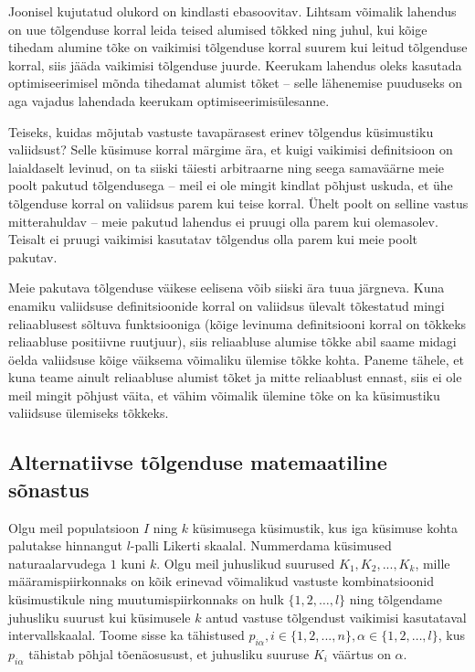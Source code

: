 \documentclass[a4paper,12pt,oneside]{article}
\numberwithin{equation}{section}
\theoremstyle{definition}
\begin{document}
Joonisel kujutatud olukord on kindlasti ebasoovitav. Lihtsam võimalik lahendus on uue tõlgenduse korral leida teised alumised tõkked ning juhul, kui kõige tihedam alumine tõke on vaikimisi tõlgenduse korral suurem kui leitud tõlgenduse korral, siis jääda vaikimisi tõlgenduse juurde. Keerukam lahendus oleks kasutada optimiseerimisel mõnda tihedamat alumist tõket -- selle lähenemise puuduseks on aga vajadus lahendada keerukam optimiseerimisülesanne.

Teiseks, kuidas mõjutab vastuste tavapärasest erinev tõlgendus küsimustiku valiidsust? Selle küsimuse korral märgime ära, et kuigi vaikimisi definitsioon on laialdaselt levinud, on ta siiski täiesti arbitraarne ning seega samaväärne meie poolt pakutud tõlgendusega -- meil ei ole mingit kindlat põhjust uskuda, et ühe tõlgenduse korral on valiidsus parem kui teise korral. Ühelt poolt on selline vastus mitterahuldav -- meie pakutud lahendus ei pruugi olla parem kui olemasolev. Teisalt ei pruugi vaikimisi kasutatav tõlgendus olla parem kui meie poolt pakutav. 

Meie pakutava tõlgenduse väikese eelisena võib siiski ära tuua järgneva. 
Kuna enamiku valiidsuse definitsioonide korral on valiidsus ülevalt tõkestatud mingi reliaablusest sõltuva funktsiooniga (kõige levinuma definitsiooni korral on tõkkeks reliaabluse positiivne ruutjuur), siis reliaabluse alumise tõkke abil saame midagi öelda valiidsuse kõige väiksema võimaliku ülemise tõkke kohta. Paneme tähele, et kuna teame ainult reliaabluse alumist tõket ja mitte reliaablust ennast, siis ei ole meil mingit põhjust väita, et vähim võimalik ülemine tõke on ka küsimustiku valiidsuse ülemiseks tõkkeks.
 

\subsection{Alternatiivse tõlgenduse matemaatiline sõnastus}


Olgu meil populatsioon $I$ ning $k$ küsimusega küsimustik, kus iga küsimuse kohta palutakse hinnangut $l$-palli Likerti skaalal. Nummerdama küsimused naturaalarvudega $1$ kuni $k$. Olgu meil juhuslikud suurused $K_1,K_2,...,K_k$, mille määramis\-piirkonnaks on kõik erinevad võimalikud vastuste kombinatsioonid küsimustikule ning muutumispiirkonnaks on hulk $\lbrace 1,2,\ldots,l \rbrace$ ning tõlgendame juhusliku suurust kui küsimusele $k$ antud vastuse tõlgendust vaikimisi kasutataval intervallskaalal.  Toome sisse ka tähistused $p_{i \alpha}, i \in \{1,2,...,n\}, \alpha \in \lbrace 1,2,\ldots,l \rbrace $, kus $p_{i \alpha}$ tähistab põhjal tõenäosusust, et juhusliku suuruse $K_i$ väärtus on $\alpha$. 
\end{document}
